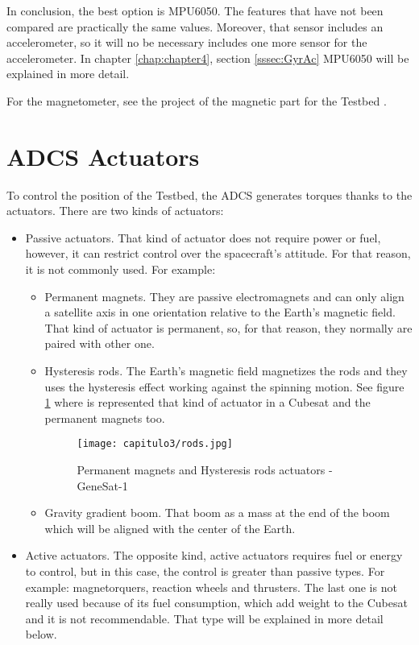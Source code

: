 In conclusion, the best option is MPU6050. The features that have not been compared are practically the same values. Moreover, that sensor includes an accelerometer, so it will no be necessary includes one more sensor for the accelerometer. In chapter \ref{chap:chapter4}, section \ref{sssec:GyrAc} MPU6050 will be explained in more detail.

For the magnetometer, see the project of the magnetic part for the Testbed \cite{alejandro}.

\section{\acrshort{ADCS} Actuators}\label{sec:actuators}

To control the position of the Testbed, the \acrshort{ADCS} generates torques thanks to the actuators. There are two kinds of actuators:
\begin{itemize}
\item Passive actuators. That kind of actuator does not require power or fuel, however, it can restrict control over the spacecraft’s attitude. For that reason, it is not commonly used. For example: 
\begin{itemize}
\item Permanent magnets. They are passive electromagnets  and can only align a satellite axis in one orientation relative to the Earth's magnetic field. That kind of actuator is permanent, so, for that reason, they normally are paired with other one. 
\item Hysteresis rods. The Earth's magnetic field magnetizes the rods and they uses the hysteresis effect working against the spinning motion. See figure \ref{fig:rods} where is represented that kind of actuator in a Cubesat and the permanent magnets too.
\begin{figure}[H]
	\centering
		\texttt{[image: capitulo3/rods.jpg]}
	\caption{Permanent magnets and Hysteresis rods actuators - GeneSat-1 \cite{genesat}}
	\label{fig:rods}
\end{figure}

\item Gravity gradient boom. That boom as a mass at the end of the boom which will be aligned with the center of the Earth.
\end{itemize}
\item Active actuators. The opposite kind, active actuators requires fuel or energy to control, but in this case, the control is greater than passive types. For example: magnetorquers, reaction wheels and thrusters. The last one is not really used because of its fuel consumption, which add weight to the Cubesat and it is not recommendable. That type will be explained in more detail below.
\end{itemize}


